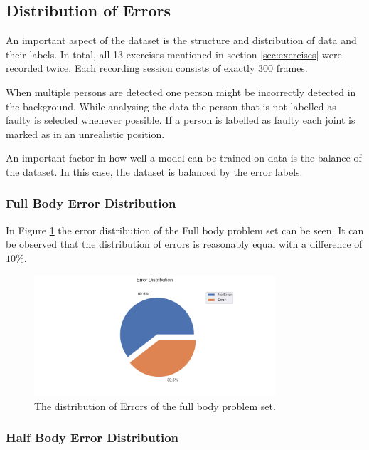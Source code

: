 
\subsection{Distribution of Errors}

An important aspect of the dataset is the structure and distribution of data and their labels. In total, all 13 exercises mentioned in section \ref{sec:exercises} were recorded twice. Each recording session consists of exactly 300 frames.

When multiple persons are detected one person might be incorrectly detected in the background. While analysing the data the person that is not labelled as faulty is selected whenever possible. If a person is labelled as faulty each joint is marked as in an unrealistic position.

An important factor in how well a model can be trained on data is the balance of the dataset. In this case, the dataset is balanced by the error labels. 

\subsubsection{Full Body Error Distribution}

In Figure \ref{fig:fb_pie} the error distribution of the Full body problem set can be seen. It can be observed that the distribution of errors is reasonably equal with a difference of $10\%$. 

\begin{figure}[ht]
  \centering
  \includegraphics[width=0.8\textwidth]{figures/Data/dist_full_body/Error_Distribution_by_Body_Half.png}
  \caption[Error Distribution of the Full Body]{The distribution of Errors of the full body problem set.}
  \label{fig:fb_pie}
\end{figure}

\subsubsection{Half Body Error Distribution}

